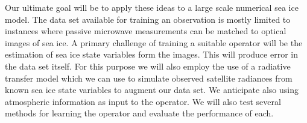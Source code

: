 \documentclass[landscape,a0paper,fontscale=0.3]{baposter} %
\begin{document}
\begin{poster}
{\vspace{.1cm} Our ultimate goal will be to apply these ideas to a large scale numerical sea ice model. The data set available for training an observation is mostly limited to instances where passive microwave measurements can be matched to optical images of sea ice. A primary challenge of training a suitable operator will be the estimation of sea ice state variables form the images. This will produce error in the data set itself. For this purpose we will also employ the use of a radiative transfer model which we can use to simulate observed satellite radiances from known sea ice state variables to augment our data set. We anticipate also using atmospheric information as input to the operator. We will also test several methods for learning the operator and evaluate the performance of each. 

}


\end{poster}
\end{document}
